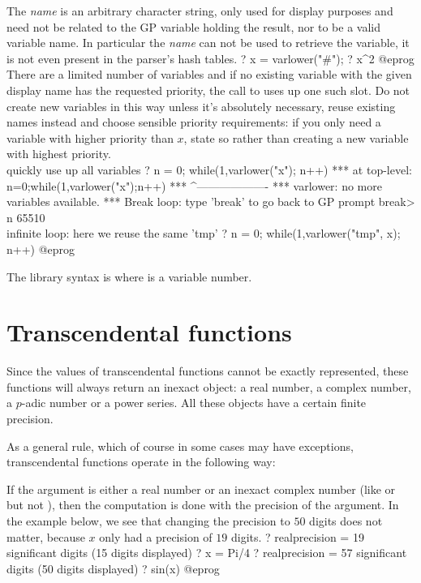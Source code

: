 The \emph{name} is an arbitrary character string, only used for display
purposes and need not be related to the GP variable holding the result, nor
to be a valid variable name. In particular the \emph{name} can
not be used to retrieve the variable, it is not even present in the parser's
hash tables.
\bprog
? x = varlower("#");
? x^2
@eprog
 There are a limited number of variables and if no
existing variable with the given display name has the requested
priority, the call to  uses up one such slot. Do not create
new variables in this way unless it's absolutely necessary,
reuse existing names instead and choose sensible priority requirements:
if you only need a variable with higher priority than $x$, state so
rather than creating a new variable with highest priority.
\bprog
\\ quickly use up all variables
? n = 0; while(1,varlower("x"); n++)
 ***   at top-level: n=0;while(1,varlower("x");n++)
 ***                             ^-------------------
 *** varlower: no more variables available.
 ***   Break loop: type 'break' to go back to GP prompt
break> n
65510
\\ infinite loop: here we reuse the same 'tmp'
? n = 0; while(1,varlower("tmp", x); n++)
@eprog

The library syntax is  where  is a variable number.

\section{Transcendental functions}\label{se:trans}

Since the values of transcendental functions cannot be exactly represented,
these functions will always return an inexact object: a real number,
a complex number, a $p$-adic number or a power series.  All these objects
have a certain finite precision.

As a general rule, which of course in some cases may have exceptions,
transcendental functions operate in the following way:

\item If the argument is either a real number or an inexact complex number
(like  or  but not ), then the
computation is done with the precision of the argument.
In the example below, we see that changing the precision to $50$ digits does
not matter, because $x$ only had a precision of $19$ digits.
\bprog
? 
   realprecision = 19 significant digits (15 digits displayed)
? x = Pi/4
? 
   realprecision = 57 significant digits (50 digits displayed)
? sin(x)
@eprog

